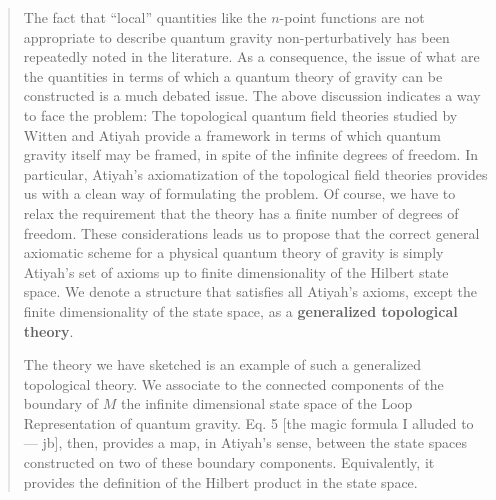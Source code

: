 \documentclass[12pt]{article}
\begin{document}
\begin{quote}
The fact that ``local'' quantities like the \(n\)-point functions are
not appropriate to describe quantum gravity non-perturbatively has been
repeatedly noted in the literature. As a consequence, the issue of what
are the quantities in terms of which a quantum theory of gravity can be
constructed is a much debated issue. The above discussion indicates a
way to face the problem: The topological quantum field theories studied
by Witten and Atiyah provide a framework in terms of which quantum
gravity itself may be framed, in spite of the infinite degrees of
freedom. In particular, Atiyah's axiomatization of the topological field
theories provides us with a clean way of formulating the problem. Of
course, we have to relax the requirement that the theory has a finite
number of degrees of freedom. These considerations leads us to propose
that the correct general axiomatic scheme for a physical quantum theory
of gravity is simply Atiyah's set of axioms up to finite dimensionality
of the Hilbert state space. We denote a structure that satisfies all
Atiyah's axioms, except the finite dimensionality of the state space, as
a \textbf{generalized topological theory}.

The theory we have sketched is an example of such a generalized
topological theory. We associate to the connected components of the
boundary of \(M\) the infinite dimensional state space of the Loop
Representation of quantum gravity. Eq. 5 {[}the magic formula I alluded
to --- jb{]}, then, provides a map, in Atiyah's sense, between the state
spaces constructed on two of these boundary components. Equivalently, it
provides the definition of the Hilbert product in the state space.


\end{quote}
\end{document}
